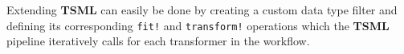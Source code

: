 \documentclass{juliacon}
\begin{document}
\vskip 6pt

Extending \textbf{TSML} can easily be done by creating a custom data type filter and defining its corresponding \texttt{fit!} and \texttt{transform!} operations which the \textbf{TSML} pipeline iteratively calls for each transformer in the workflow.



\end{document}
